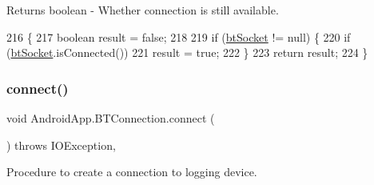 \begin{DoxyReturn}{Returns}
boolean -\/ Whether connection is still available. 
\end{DoxyReturn}

\begin{DoxyCode}
216                                  \{
217         \textcolor{keywordtype}{boolean} result = \textcolor{keyword}{false};
218 
219         \textcolor{keywordflow}{if} (\hyperlink{class_android_app_1_1_b_t_connection_af3cdc6c880b28361d87d0118ace0e49c}{btSocket} != null) \{
220             \textcolor{keywordflow}{if} (\hyperlink{class_android_app_1_1_b_t_connection_af3cdc6c880b28361d87d0118ace0e49c}{btSocket}.isConnected())
221                 result = \textcolor{keyword}{true};
222         \}
223         \textcolor{keywordflow}{return} result;
224     \}
\end{DoxyCode}
\mbox{\label{class_android_app_1_1_b_t_connection_a1dfc9451ba1b40089f17ee081486602e}} 
\subsubsection{\texorpdfstring{connect()}{connect()}}
{\footnotesize\ttfamily void Android\+App.\+B\+T\+Connection.\+connect (\begin{DoxyParamCaption}{ }\end{DoxyParamCaption}) throws I\+O\+Exception\hspace{0.3cm}{\ttfamily [inline]}, {\ttfamily [private]}}



Procedure to create a connection to logging device. 

